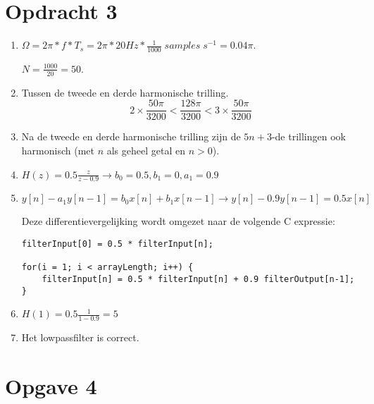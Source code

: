 \documentclass[10pt,a4paper]{article}
\begin{document}

\section*{Opdracht 3} %
\label{sec:Opdracht 3}

\begin{enumerate}
    \item $ \Omega = 2\pi * f * T_s = 2\pi * 20 Hz * \frac{1}{1000} \; samples
        \; s^{-1} = 0.04 \pi $.

    \noindent $ N = \frac{1000}{20} = 50 $.

    \item Tussen de tweede en derde harmonische trilling.
    \[ 2 \times \frac{50 \pi}{3200} < \frac{128 \pi}{3200} < 3 \times
    \frac{50 \pi}{3200} \]

    \item Na de tweede en derde harmonische trilling zijn de $5n+3$-de
    trillingen ook harmonisch (met $n$ als geheel getal en $n > 0$).

    \item $H(z) = 0.5 \frac{z}{z-0.9} \rightarrow b_0 = 0.5, b_1 = 0, a_1 = 0.9$

    \item $y[n] - a_1y[n-1] = b_0x[n] + b_1x[n-1]
        \rightarrow y[n] - 0.9y[n-1] = 0.5x[n]$

    Deze differentievergelijking wordt omgezet naar de volgende C expressie:

    \begin{verbatim}
filterInput[0] = 0.5 * filterInput[n];

for(i = 1; i < arrayLength; i++) {
    filterInput[n] = 0.5 * filterInput[n] + 0.9 filterOutput[n-1];
}
    \end{verbatim}

    \item $H(1) = 0.5 \frac{1}{1 - 0.9} = 5 $

    \item Het lowpassfilter is correct.

\end{enumerate}


\section*{Opgave 4} %
\label{sec:Opgave 4}
\end{document}
